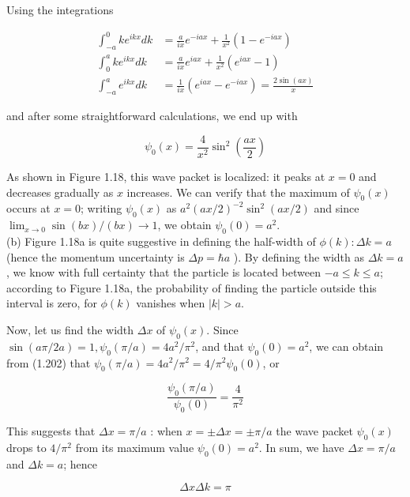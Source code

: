 \documentclass[10pt]{article}
\begin{document}
Using the integrations


\begin{align*}
\int_{-a}^{0} k e^{i k x} d k & =\frac{a}{i x} e^{-i a x}+\frac{1}{x^{2}}\left(1-e^{-i a x}\right)  \tag{1.199}\\
\int_{0}^{a} k e^{i k x} d k & =\frac{a}{i x} e^{i a x}+\frac{1}{x^{2}}\left(e^{i a x}-1\right)  \tag{1.200}\\
\int_{-a}^{a} e^{i k x} d k & =\frac{1}{i x}\left(e^{i a x}-e^{-i a x}\right)=\frac{2 \sin (a x)}{x} \tag{1.201}
\end{align*}


and after some straightforward calculations, we end up with


\begin{equation*}
\psi_{0}(x)=\frac{4}{x^{2}} \sin ^{2}\left(\frac{a x}{2}\right) \tag{1.202}
\end{equation*}


As shown in Figure 1.18, this wave packet is localized: it peaks at $x=0$ and decreases gradually as $x$ increases. We can verify that the maximum of $\psi_{0}(x)$ occurs at $x=0$; writing $\psi_{0}(x)$ as $a^{2}(a x / 2)^{-2} \sin ^{2}(a x / 2)$ and since $\lim _{x \rightarrow 0} \sin (b x) /(b x) \rightarrow 1$, we obtain $\psi_{0}(0)=a^{2}$.\\
(b) Figure 1.18a is quite suggestive in defining the half-width of $\phi(k): \Delta k=a$ (hence the momentum uncertainty is $\Delta p=\hbar a$ ). By defining the width as $\Delta k=a$, we know with full certainty that the particle is located between $-a \leq k \leq a$; according to Figure 1.18a, the probability of finding the particle outside this interval is zero, for $\phi(k)$ vanishes when $|k|>a$.

Now, let us find the width $\Delta x$ of $\psi_{0}(x)$. Since $\sin (a \pi / 2 a)=1, \psi_{0}(\pi / a)=4 a^{2} / \pi^{2}$, and that $\psi_{0}(0)=a^{2}$, we can obtain from (1.202) that $\psi_{0}(\pi / a)=4 a^{2} / \pi^{2}=4 / \pi^{2} \psi_{0}(0)$, or


\begin{equation*}
\frac{\psi_{0}(\pi / a)}{\psi_{0}(0)}=\frac{4}{\pi^{2}} \tag{1.203}
\end{equation*}


This suggests that $\Delta x=\pi / a$ : when $x= \pm \Delta x= \pm \pi / a$ the wave packet $\psi_{0}(x)$ drops to $4 / \pi^{2}$ from its maximum value $\psi_{0}(0)=a^{2}$. In sum, we have $\Delta x=\pi / a$ and $\Delta k=a$; hence


\begin{equation*}
\Delta x \Delta k=\pi \tag{1.204}
\end{equation*}
\end{document}
